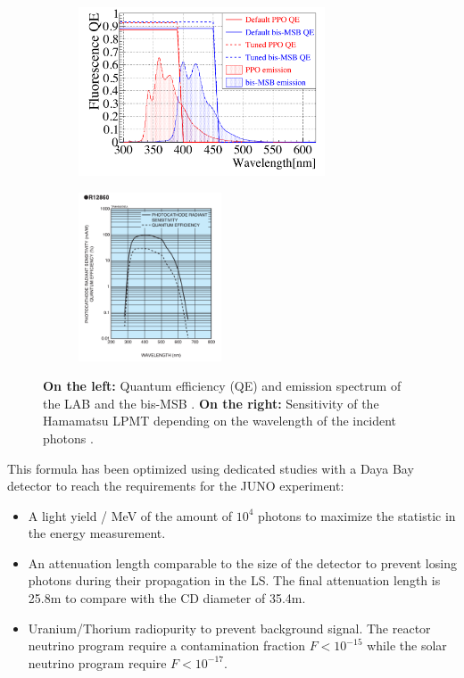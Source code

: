 \documentclass[../main.tex]{subfiles}
\begin{document}
\begin{figure}[ht]
  \centering
  \begin{subfigure}[b]{0.48\textwidth}
    \centering
    \includegraphics[height=5cm]{images/juno/LS_spectrum.png}
  \end{subfigure}
  \hfill
  \begin{subfigure}[b]{0.48\textwidth}
    \centering
    \includegraphics[height=5cm]{images/juno/LPMT_efficiency.png}
  \end{subfigure}
  \caption{\textbf{On the left:} Quantum efficiency (QE) and emission spectrum of the LAB and the bis-MSB \cite{bay_optimization_2020}. \textbf{On the right:} Sensitivity of the Hamamatsu LPMT depending on the wavelength of the incident photons \cite{noauthor_photomultiplier_nodate}.}
  \label{fig:juno:LS_spectrum_and_PMT_sensitivity}
\end{figure}

This formula has been optimized using dedicated studies with a Daya Bay detector \cite{bay_optimization_2020, zhang_complete_2020} to reach the requirements for the JUNO experiment:
\begin{itemize}
  \item A light yield / MeV of the amount of $10^4$ photons to maximize the statistic in the energy measurement.
  \item An attenuation length comparable to the size of the detector to prevent losing photons during their propagation in the LS. The final attenuation length is 25.8m \cite{yang_light_2017} to compare with the CD diameter of 35.4m.
  \item Uranium/Thorium radiopurity to prevent background signal. The reactor neutrino program require a contamination fraction $F<10^{-15}$ while the solar neutrino program require $F<10^{-17}$.
\end{itemize}
\end{document}
